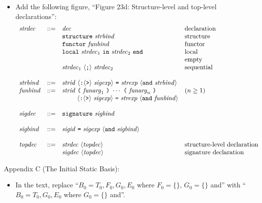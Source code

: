 \documentclass[twoside,titlepage]{article}
\begin{document}
\begin{appendix}
\begin{itemize}
\item Add the following figure, ``Figure 23d: Structure-level and top-level declarations'':
  $$
  \begin{array}{llll}
  \mathit{strdec} & ::= & \mathit{dec} & \textrm{declaration} \\
  && {\tt{structure}}~\mathit{strbind} & \textrm{structure} \\
  && {\tt{functor}}~\mathit{funbind} & \textrm{functor} \\
  && {\tt{local}}~\mathit{strdec}_1~{\tt{in}}~\mathit{strdec}_2~{\tt{end}} & \textrm{local} \\
  && & \textrm{empty} \\
  && \mathit{strdec}_1~\langle\mbox{\tt;}\rangle~\mathit{strdec}_2 & \textrm{sequential} \\
  \\
  \mathit{strbind} & ::= & \mathit{strid}~\langle\mbox{\tt:}\langle\mbox{\tt>}\rangle~\mathit{sigexp}\rangle~\mbox{\tt=}~\mathit{strexp}~\langle{\tt{and}}~\mathit{strbind}\rangle \\
  \mathit{funbind} & ::= & \mathit{strid}~\mbox{\tt(}~\mathit{funarg}_1~\mbox{\tt)}~\cdots~\mbox{\tt(}~\mathit{funarg}_n~\mbox{\tt)} & (n\geq1) \\
  && ~~~~~~~\langle\mbox{\tt:}\langle\mbox{\tt>}\rangle~\mathit{sigexp}\rangle~\mbox{\tt=}~\mathit{strexp}~\langle{\tt{and}}~\mathit{funbind}\rangle \\
  \\
  \mathit{sigdec} & ::= & {\tt{signature}}~\mathit{sigbind} \\
  \\
  \mathit{sigbind} & ::= & \mathit{sigid}~\mbox{\tt=}~\mathit{sigexp}~\langle{\tt{and}}~\mathit{sigbind}\rangle \\
  \\
  \mathit{topdec} & ::= & \mathit{strdec}~\langle\mathit{topdec}\rangle & \textrm{structure-level declaration} \\
  && \mathit{sigdec}~\langle\mathit{topdec}\rangle & \textrm{signature declaration} \\
  \end{array}
  $$
\end{itemize}

Appendix C (The Initial Static Basis):
\begin{itemize}
\item In the text, replace ``$B_0 = T_0,F_0,G_0,E_0$ where $F_0=\{\}$, $G_0=\{\}$ and'' with ``$B_0 = T_0,G_0,E_0$ where $G_0=\{\}$ and''.
\end{itemize}


\end{appendix}
\end{document}
